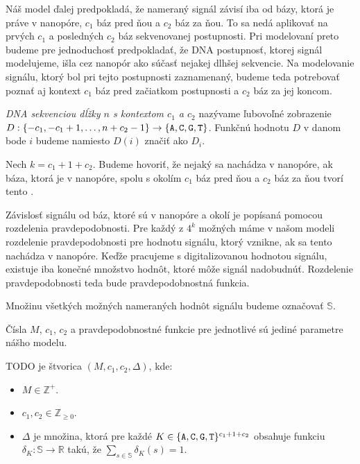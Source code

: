 Náš model ďalej predpokladá, že nameraný signál závisí iba od bázy, ktorá je práve v nanopóre, $c_1$
báz pred ňou a $c_2$ báz za ňou. To sa nedá aplikovať na prvých $c_1$ a posledných $c_2$ báz 
sekvenovanej postupnosti. Pri modelovaní preto budeme pre jednoduchosť predpokladať, že DNA postupnosť, 
ktorej signál modelujeme, išla cez nanopór ako súčasť nejakej dlhšej sekvencie. Na modelovanie
signálu, ktorý bol pri tejto postupnosti zaznamenaný, budeme teda potrebovať poznať aj 
kontext $c_1$ báz pred začiatkom postupnosti a $c_2$ báz za jej koncom.

\begin{definicia}

\emph{DNA sekvenciou dĺžky $n$ s kontextom $c_1$ a $c_2$} nazývame ľubovoľné zobrazenie 
$D: \{-c_1, -c_1+1, \dots, n+c_2 - 1\} \rightarrow \{\texttt{A}, \texttt{C}, \texttt{G}, \texttt{T}\}$. Funkčnú hodnotu $D$ v danom bode $i$
budeme namiesto $D(i)$ značiť ako $D_i$.

\end{definicia}

Nech $k = c_1 + 1 + c_2$. Budeme hovoriť, že nejaký \kmer{} sa nachádza v nanopóre, ak báza, 
ktorá je v nanopóre, spolu s okolím $c_1$ báz pred ňou a $c_2$ báz za ňou tvorí tento \kmer{}.

Závislosť signálu od báz, ktoré sú v nanopóre a okolí je popísaná pomocou rozdelenia pravdepodobnosti.
Pre každý z $4^k$ možných   máme v našom modeli rozdelenie 
pravdepodobnosti pre hodnotu signálu, ktorý vznikne, ak sa tento \kmer{} nachádza v nanopóre.
Keďže pracujeme s digitalizovanou hodnotou signálu, existuje iba konečné množstvo hodnôt, ktoré
môže signál nadobudnúť. Rozdelenie pravdepodobnosti teda bude pravdepodobnostná funkcia.

\begin{definicia}

Množinu všetkých možných nameraných hodnôt signálu budeme označovať $\mathbb{S}$.

\end{definicia}

Čísla $M$, $c_1$, $c_2$ a pravdepodobnostné funkcie pre jednotlivé  sú jediné
parametre nášho modelu.

\begin{definicia}

TODO je štvorica $(M, c_1, c_2, \Delta)$, kde:

\begin{itemize}
\item $M \in \mathbb{Z}^+$.
\item $c_1, c_2 \in \mathbb{Z}_{\geq 0}$.
\item $\Delta$ je množina, ktorá pre každé $K \in \{\texttt{A}, \texttt{C}, \texttt{G}, \texttt{T}\}^{c_1 + 1 + c_2}$ obsahuje funkciu
$\delta_K: \mathbb{S} \rightarrow \mathbb{R}$ takú, že $\sum\limits_{s \in \mathbb{S}} \delta_K(s) = 1$.
\end{itemize}
\end{definicia}

